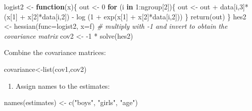 \documentclass[
]{book}
\newenvironment{Shaded}{\begin{snugshade}}{\end{snugshade}}
\newcommand{\AttributeTok}[1]{\textcolor[rgb]{0.77,0.63,0.00}{#1}}
\newcommand{\CommentTok}[1]{\textcolor[rgb]{0.56,0.35,0.01}{\textit{#1}}}
\newcommand{\ControlFlowTok}[1]{\textcolor[rgb]{0.13,0.29,0.53}{\textbf{#1}}}
\newcommand{\DecValTok}[1]{\textcolor[rgb]{0.00,0.00,0.81}{#1}}
\newcommand{\FunctionTok}[1]{\textcolor[rgb]{0.00,0.00,0.00}{#1}}
\newcommand{\NormalTok}[1]{#1}
\newcommand{\OtherTok}[1]{\textcolor[rgb]{0.56,0.35,0.01}{#1}}
\newcommand{\SpecialCharTok}[1]{\textcolor[rgb]{0.00,0.00,0.00}{#1}}
\newcommand{\StringTok}[1]{\textcolor[rgb]{0.31,0.60,0.02}{#1}}
\providecommand{\tightlist}{%
  \setlength{\itemsep}{0pt}\setlength{\parskip}{0pt}}
\begin{document}
\begin{Shaded}
\begin{Highlighting}[]
\NormalTok{logist2 }\OtherTok{\textless{}{-}} \ControlFlowTok{function}\NormalTok{(x)\{}
\NormalTok{  out }\OtherTok{\textless{}{-}} \DecValTok{0}
  \ControlFlowTok{for}\NormalTok{ (i }\ControlFlowTok{in} \DecValTok{1}\SpecialCharTok{:}\NormalTok{ngroup[}\DecValTok{2}\NormalTok{])\{ }
\NormalTok{    out }\OtherTok{\textless{}{-}}\NormalTok{ out }\SpecialCharTok{+}\NormalTok{ data[i,}\DecValTok{3}\NormalTok{]}\SpecialCharTok{*}\NormalTok{(x[}\DecValTok{1}\NormalTok{] }\SpecialCharTok{+}\NormalTok{ x[}\DecValTok{2}\NormalTok{]}\SpecialCharTok{*}\NormalTok{data[i,}\DecValTok{2}\NormalTok{]) }\SpecialCharTok{{-}} \FunctionTok{log}\NormalTok{ (}\DecValTok{1} \SpecialCharTok{+}
    \FunctionTok{exp}\NormalTok{(x[}\DecValTok{1}\NormalTok{] }\SpecialCharTok{+}\NormalTok{ x[}\DecValTok{2}\NormalTok{]}\SpecialCharTok{*}\NormalTok{data[i,}\DecValTok{2}\NormalTok{]))}
\NormalTok{  \}}
  \FunctionTok{return}\NormalTok{(out)}
\NormalTok{\}}
\NormalTok{hes2 }\OtherTok{\textless{}{-}} \FunctionTok{hessian}\NormalTok{(}\AttributeTok{func=}\NormalTok{logist2, }\AttributeTok{x=}\NormalTok{f)}
\CommentTok{\# multiply with {-}1 and invert to obtain the covariance matrix}
\NormalTok{cov2 }\OtherTok{\textless{}{-}} \SpecialCharTok{{-}}\DecValTok{1} \SpecialCharTok{*} \FunctionTok{solve}\NormalTok{(hes2)}
\end{Highlighting}
\end{Shaded}

Combine the covariance matrices:

\begin{Shaded}
\begin{Highlighting}[]
\NormalTok{covariance}\OtherTok{\textless{}{-}}\FunctionTok{list}\NormalTok{(cov1,cov2)}
\end{Highlighting}
\end{Shaded}

\begin{enumerate}
\def\labelenumi{\arabic{enumi})}
\setcounter{enumi}{1}
\tightlist
\item
  Assign names to the estimates:
\end{enumerate}

\begin{Shaded}
\begin{Highlighting}[]
\FunctionTok{names}\NormalTok{(estimates) }\OtherTok{\textless{}{-}} \FunctionTok{c}\NormalTok{(}\StringTok{"boys"}\NormalTok{, }\StringTok{"girls"}\NormalTok{, }\StringTok{"age"}\NormalTok{)}
\end{Highlighting}
\end{Shaded}
\end{document}
